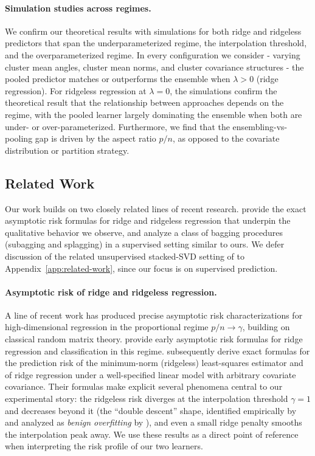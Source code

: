 \documentclass{article}
\theoremstyle{plain}
\theoremstyle{remark}
\begin{document}
\paragraph{Simulation studies across regimes.} We confirm our theoretical results with simulations for both ridge and ridgeless predictors that span the underparameterized regime, the interpolation threshold, and the overparameterized regime. In every configuration we consider - varying cluster mean angles, cluster mean norms, and cluster covariance structures - the pooled predictor matches or outperforms the ensemble when $\lambda > 0$ (ridge regression). For ridgeless regression at $\lambda = 0$, the simulations confirm the theoretical result that the relationship between approaches depends on the regime, with the pooled learner largely dominating the ensemble when both are under- or over-parameterized. Furthermore, we find that the ensembling-vs-pooling gap is driven by the aspect ratio $p/n$, as opposed to the covariate distribution or partition strategy.




\subsection{Related Work}
\label{sec:related-work}

Our work builds on two closely related lines of recent research. \citet{hastie2022surprises} provide the exact asymptotic risk formulas for ridge and ridgeless regression that underpin the qualitative behavior we observe, and \citet{patil2023bagging} analyze a class of bagging procedures (subagging and splagging) in a supervised setting similar to ours. We defer discussion of the related unsupervised stacked-SVD setting of \citet{baharav2025stackedsvd} to Appendix~\ref{app:related-work}, since our focus is on supervised prediction.

\paragraph{Asymptotic risk of ridge and ridgeless regression.}
A line of recent work has produced precise asymptotic risk characterizations for high-dimensional regression in the proportional regime $p/n \to \gamma$, building on classical random matrix theory. \citet{dobriban2018high} provide early asymptotic risk formulas for ridge regression and classification in this regime. \citet{hastie2022surprises} subsequently derive exact formulas for the prediction risk of the minimum-norm (ridgeless) least-squares estimator and of ridge regression under a well-specified linear model with arbitrary covariate covariance. Their formulas make explicit several phenomena central to our experimental story: the ridgeless risk diverges at the interpolation threshold $\gamma = 1$ and decreases beyond it (the ``double descent'' shape, identified empirically by \citet{belkin2019reconciling} and analyzed as \emph{benign overfitting} by \citet{bartlett2020benign}), and even a small ridge penalty smooths the interpolation peak away. We use these results as a direct point of reference when interpreting the risk profile of our two learners.
\end{document}
